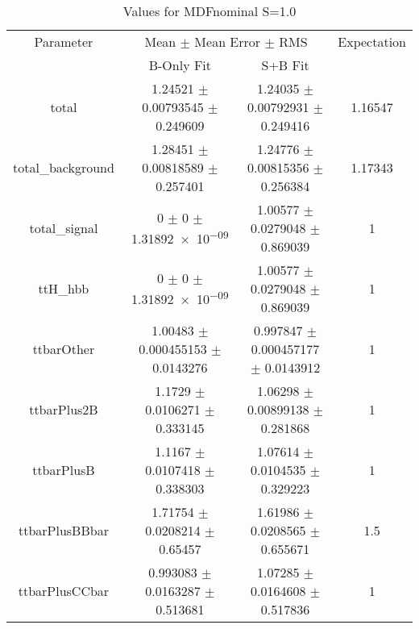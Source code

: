 \begin{table}
\centering
\caption{Values for MDFnominal S=1.0}
\begin{tabular}{cccc}
\toprule
Parameter & \multicolumn{2}{c}{Mean $\pm$ Mean Error $\pm$ RMS} & Expectation\\
 & B-Only Fit & S+B Fit & \\
\midrule
total & \num{1.24521} $\pm$ \num{0.00793545} $\pm$ \num{0.249609} & \num{1.24035} $\pm$ \num{0.00792931} $\pm$ \num{0.249416} & \num{1.16547}\\
total\_background & \num{1.28451} $\pm$ \num{0.00818589} $\pm$ \num{0.257401} & \num{1.24776} $\pm$ \num{0.00815356} $\pm$ \num{0.256384} & \num{1.17343}\\
total\_signal & \num{0} $\pm$ \num{0} $\pm$ \num{1.31892e-09} & \num{1.00577} $\pm$ \num{0.0279048} $\pm$ \num{0.869039} & \num{1}\\
ttH\_hbb & \num{0} $\pm$ \num{0} $\pm$ \num{1.31892e-09} & \num{1.00577} $\pm$ \num{0.0279048} $\pm$ \num{0.869039} & \num{1}\\
ttbarOther & \num{1.00483} $\pm$ \num{0.000455153} $\pm$ \num{0.0143276} & \num{0.997847} $\pm$ \num{0.000457177} $\pm$ \num{0.0143912} & \num{1}\\
ttbarPlus2B & \num{1.1729} $\pm$ \num{0.0106271} $\pm$ \num{0.333145} & \num{1.06298} $\pm$ \num{0.00899138} $\pm$ \num{0.281868} & \num{1}\\
ttbarPlusB & \num{1.1167} $\pm$ \num{0.0107418} $\pm$ \num{0.338303} & \num{1.07614} $\pm$ \num{0.0104535} $\pm$ \num{0.329223} & \num{1}\\
ttbarPlusBBbar & \num{1.71754} $\pm$ \num{0.0208214} $\pm$ \num{0.65457} & \num{1.61986} $\pm$ \num{0.0208565} $\pm$ \num{0.655671} & \num{1.5}\\
ttbarPlusCCbar & \num{0.993083} $\pm$ \num{0.0163287} $\pm$ \num{0.513681} & \num{1.07285} $\pm$ \num{0.0164608} $\pm$ \num{0.517836} & \num{1}\\
\bottomrule
\end{tabular}
\end{table}